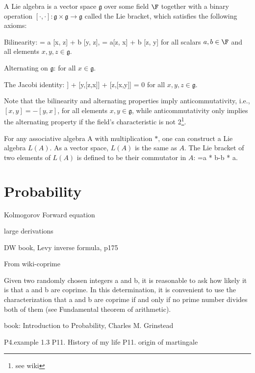 \begin{definition}\label{def:lie_algebra}
A Lie algebra is a vector space $\mathfrak{g}$ over some field $\F$ together with a binary operation $[\cdot,\cdot]: \mathfrak{g}\times\mathfrak{g}\to\mathfrak{g}$ called the Lie bracket, which satisfies the following axioms:

Bilinearity:
\be
[a x + b y, z] = a [x, z] + b [y, z], \quad [z, a x + b y] = a[z, x] + b [z, y] 
\ee
for all scalars $a, b \in\F$ and all elements $x, y, z \in \mathfrak{g}$.

Alternating on $\mathfrak{g}$:
\ee
for all $x \in \mathfrak{g}$.

The Jacobi identity:
\be
[x,[y,z]] + [y,[z,x]] + [z,[x,y]] = 0 \quad 
\ee
for all $x, y, z \in \mathfrak{g}$.

Note that the bilinearity and alternating properties imply anticommutativity, i.e., $[x,y]=-[y,x]$, for all elements $x, y \in \mathfrak{g}$, while anticommutativity only implies the alternating property if the field's characteristic is not 2\footnote{see wiki}.

For any associative algebra A with multiplication $*$, one can construct a Lie algebra $L(A)$. As a vector space, $L(A)$ is the same as $A$. The Lie bracket of two elements of $L(A)$ is defined to be their commutator in $A$:
\be
[a,b]=a * b-b * a.
\ee
\end{definition}


\section{Probability}

\ben
\item [(i)] Kolmogorov Forward equation
\item [(ii)] large derivations
\item [(iii)] DW book, Levy inverse formula, p175
\een

From wiki-coprime

Given two randomly chosen integers a and b, it is reasonable to ask how likely it is that a and b are coprime. In this determination, it is convenient to use the characterization that a and b are coprime if and only if no prime number divides both of them (see Fundamental theorem of arithmetic).

book: Introduction to Probability, Charles M. Grinstead

P4.example 1.3
P11. History of my life
P11. origin of martingale

